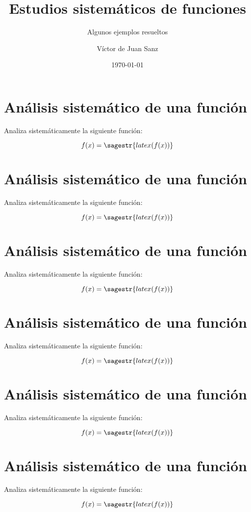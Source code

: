 \documentclass[nochap,palatino,nobuilddate]{estudioFuncion}
\title{Estudios sistemáticos de funciones}
\author{Víctor de Juan Sanz}
\date{\today}
\subtitle{Algunos ejemplos resueltos}
\newif\ifbreve
\newcommand{\newexample}[1]{
	\section{Análisis sistemático de una función}
	Analiza sistemáticamente la siguiente función:
	
	\begin{mdframed}
	\[f(x) = \sagestr{latex(f(x))}\]
	\end{mdframed}
	\ifbreve
		
	\else
		
	\fi
	\newpage
}
\begin{document}
\maketitle



\newexample{tex/fun1}
\newexample{tex/fun2}
\newexample{tex/fun3}
\newexample{tex/fun4}
\newexample{tex/fun5}
\newexample{tex/fun6}
\end{document}
